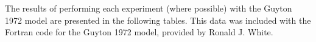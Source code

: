 The results of performing each experiment (where possible) with the Guyton 1972 model are presented in the following tables. This data was included with the Fortran code for the Guyton 1972 model, provided by Ronald J. White.





